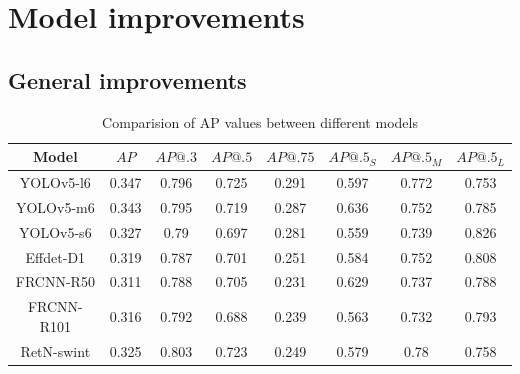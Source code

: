 \section{Model improvements}
\subsection{General improvements}
\begin{table}[h]
    \centering
    \begin{tabular}{|c|c|c|c|c|c|c|c|}
        \hline
        Model      & $AP$  & $AP@.3$ & $AP@.5$ & $AP@.75$ & $AP@.5_S$ & $AP@.5_M$ & $AP@.5_L$ \\ \hline
        YOLOv5-l6  & 0.347 & 0.796   & 0.725   & 0.291    & 0.597     & 0.772     & 0.753     \\ \hline
        YOLOv5-m6  & 0.343 & 0.795   & 0.719   & 0.287    & 0.636     & 0.752     & 0.785     \\ \hline
        YOLOv5-s6  & 0.327 & 0.79    & 0.697   & 0.281    & 0.559     & 0.739     & 0.826     \\ \hline
        Effdet-D1  & 0.319 & 0.787   & 0.701   & 0.251    & 0.584     & 0.752     & 0.808     \\ \hline
        FRCNN-R50  & 0.311 & 0.788   & 0.705   & 0.231    & 0.629     & 0.737     & 0.788     \\ \hline
        FRCNN-R101 & 0.316 & 0.792   & 0.688   & 0.239    & 0.563     & 0.732     & 0.793     \\ \hline
        RetN-swint & 0.325 & 0.803   & 0.723   & 0.249    & 0.579     & 0.78      & 0.758     \\ \hline
    \end{tabular}
    \caption{Comparision of AP values between different models}
    \label{tab:improved:precision}
\end{table}


